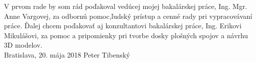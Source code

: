 \null
\vfill
\noindent

V prvom rade by som rád poďakoval vedúcej mojej bakalárskej práce, Ing. Mgr. Anne Vargovej, za odbornú pomoc,ľudský prístup a cenné rady pri vypracovávaní práce. Ďalej chcem poďakovať aj konzultantovi bakalárskej práce, Ing. Erikovi Mikulášovi, za pomoc a pripomienky pri tvorbe dosky plošných spojov a návrhu 3D modelov.\\

\noindent Bratislava, 20. mája 2018 \hfill  Peter Tibenský
\cleardoublepage


	

